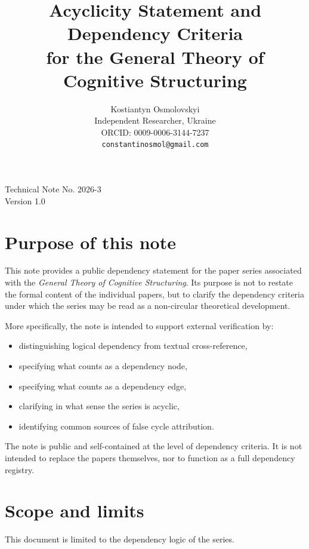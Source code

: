 \documentclass[11pt,a4paper]{article}
\title{Acyclicity Statement and Dependency Criteria\\ for the General Theory of Cognitive Structuring}
\author{
	Kostiantyn Osmolovskyi\\
	\small Independent Researcher, Ukraine\\
	\small ORCID: 0009-0006-3144-7237\\
	\small \texttt{constantinosmol@gmail.com}
}
\date{}
\begin{document}
	\maketitle

\begin{center}
	\small
	Technical Note No. 2026-3\\
	Version 1.0
\end{center}

\vspace{0.5em}
	
	\maketitle
	
	\section{Purpose of this note}
	
	This note provides a public dependency statement for the paper series associated with the
	\emph{General Theory of Cognitive Structuring}. Its purpose is not to restate the formal
	content of the individual papers, but to clarify the dependency criteria under which the
	series may be read as a non-circular theoretical development.
	
	More specifically, the note is intended to support external verification by:
	\begin{itemize}[leftmargin=2em]
		\item distinguishing logical dependency from textual cross-reference,
		\item specifying what counts as a dependency node,
		\item specifying what counts as a dependency edge,
		\item clarifying in what sense the series is acyclic,
		\item identifying common sources of false cycle attribution.
	\end{itemize}
	
	The note is public and self-contained at the level of dependency criteria. It is not intended
	to replace the papers themselves, nor to function as a full dependency registry.
	
	\section{Scope and limits}
	
	This document is limited to the dependency logic of the series.
	
\end{document}
